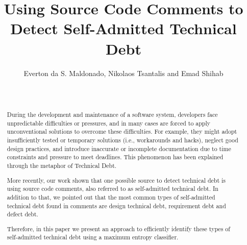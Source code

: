 \documentclass{sig-alternate}
\begin{document}

\title{Using Source Code Comments to Detect Self-Admitted Technical Debt}

\author{
\alignauthor 
       Everton da S. Maldonado, Nikolaos Tsantalis and Emad Shihab\\
       \\
       \\
}


\maketitle
\begin{abstract}
During the development and maintenance of a software system, developers face unpredictable difficulties or pressures, and in many cases are forced to apply unconventional solutions to overcome these difficulties. For example, they might adopt insufficiently tested or temporary solutions (i.e., workarounds and hacks), neglect good design practices, and introduce inaccurate or incomplete documentation due to time constraints and pressure to meet deadlines. This phenomenon has been explained through the metaphor of Technical Debt. 

More recently, our work shown that one possible source to detect technical debt is using source code comments, also referred to as self-admitted technical debt. In addition to that, we pointed out that the most common types of self-admitted technical debt found in comments are design technical debt, requirement debt and defect debt. 

Therefore, in this paper we present an approach to efficiently identify these types of self-admitted technical debt using a maximum entropy classifier. 

\end{abstract}
\end{document}
